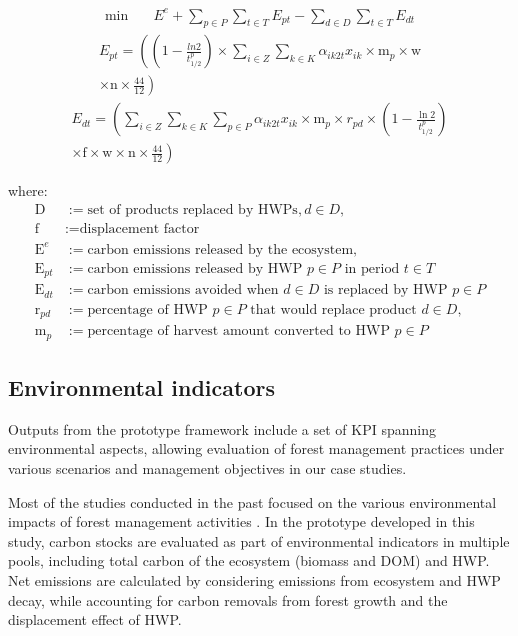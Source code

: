 \documentclass[preprint,12pt]{elsarticle}
\begin{document}
\begin{align}
   \min & \quad E^{e} + \sum_{p \in P} \sum_{t \in T} E_{pt} - \sum_{d \in D} \sum_{t \in T} E_{dt}
   \label{eq:12}
\end{align}   
\begin{multline}
    E_{pt} = \left( (1 - \frac{ln 2}{t_{1/2}^{p}}) \times 
    \sum_{i \in Z} \sum_{k \in K} \alpha_{ik2t} x_{ik} \times \text{m}_{p} \times \text{w} \right. \\
    \left. \times \text{n} \times \frac{44}{12} \right)
    \label{eq:13}
\end{multline}
\begin{multline}
    E_{dt} = \left( \sum_{i \in Z} \sum_{k \in K} \sum_{p \in P} \alpha_{ik2t} x_{ik} \times \text{m}_{p} \times r_{pd} \times \left(1 - \frac{\ln 2}{t_{1/2}^{p}}\right) \right. \\
    \left. \times \text{f} \times \text{w} \times \text{n} \times \frac{44}{12} \right)
    \label{eq:14}
\end{multline}
  
\noindent where:
\begin{align*}
    \text{D} &:= \text{set of products replaced by HWPs}, d \in D, \\
    \text{f} &:= \text{displacement factor}\\
    \text{E}^{e} &:= \text{carbon emissions released by the ecosystem}, \\
    \text{E}_{pt} &:= \text{carbon emissions released by HWP } p \in P \text{ in period } t \in T \\
    \text{E}_{dt} &:= \text{carbon emissions avoided when } d \in D \text{ is replaced by HWP }p \in P \\
    \text{r}_{pd} &:= \text{percentage of HWP } p \in P \text{ that would replace product } d \in D, \\
    \text{m}_{p} &:= \text{percentage of harvest amount converted to HWP } p \in P
    \end{align*}

\subsection{Environmental indicators}
\label{sec: indicators}
Outputs from the prototype framework include a set of KPI spanning environmental aspects, allowing evaluation of forest management practices under various scenarios and management objectives in our case studies. 

Most of the studies conducted in the past focused on the various environmental impacts of forest management activities \citep{Seely2002, KURZ2009480, Valipour2021, Boisvenue2022}. In the prototype developed in this study, carbon stocks are evaluated as part of environmental indicators in multiple pools, including total carbon of the ecosystem (biomass and DOM) and HWP.
Net emissions are calculated by considering emissions from ecosystem and HWP decay, while accounting for carbon removals from forest growth and the displacement effect of HWP. 
\end{document}
